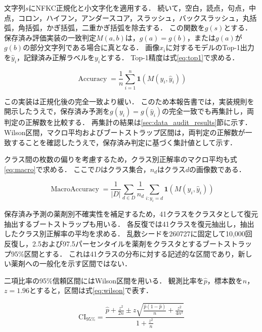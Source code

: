 \documentclass[uplatex,dvipdfmx]{jsarticle}
\begin{document}
文字列$s$にNFKC正規化と小文字化を適用する．
続いて，空白，読点，句点，中点，コロン，ハイフン，アンダースコア，スラッシュ，バックスラッシュ，丸括弧，角括弧，かぎ括弧，二重かぎ括弧を除去する．
この関数を$g(s)$とする．
保存済み評価実装の一致判定$M(a,b)$は，$g(a)=g(b)$，または$g(a)$が$g(b)$の部分文字列である場合に真となる．
画像$x_i$に対するモデルのTop-1出力を$\hat{y}_i$，記録済み正解ラベルを$y_i$とする．
Top-1精度は式\eqref{eq:top1}で求める．

\begin{equation}
  \operatorname{Accuracy}
  =
  \frac{1}{n}
  \sum_{i=1}^{n}
  \mathbf{1}\!\left(M(y_i,\hat{y}_i)\right)
  \label{eq:top1}
\end{equation}

この実装は正規化後の完全一致より緩い．
このため本報告書では，実装規則を開示したうえで，保存済み予測を$g(y_i)=g(\hat{y}_i)$の完全一致でも再集計し，両判定の正解数を比較する．
再集計の結果は\ref{sec:data_audit_results}節に示す．
Wilson区間，マクロ平均およびブートストラップ区間は，両判定の正解数が一致することを確認したうえで，保存済み判定に基づく集計値として示す．

クラス間の枚数の偏りを考慮するため，クラス別正解率のマクロ平均も式\eqref{eq:macro}で求める．
ここで$D$はクラス集合，$n_d$はクラス$d$の画像数である．

\begin{equation}
  \operatorname{MacroAccuracy}
  =
  \frac{1}{|D|}
  \sum_{d \in D}
  \frac{1}{n_d}
  \sum_{i : y_i = d}
  \mathbf{1}\!\left(M(y_i,\hat{y}_i)\right)
  \label{eq:macro}
\end{equation}

保存済み予測の薬剤別不確実性を補足するため，41クラスをクラスタとして復元抽出するブートストラップも用いる．
各反復では41クラスを復元抽出し，抽出したクラス別正解率の平均を求める．
乱数シードを260727に固定して10,000回反復し，2.5および97.5パーセンタイルを薬剤をクラスタとするブートストラップ95\%区間とする．
これは41クラスの分布に対する記述的な区間であり，新しい薬剤への一般化を示す区間ではない．

二項比率の95\%信頼区間にはWilson区間を用いる．
観測比率を$\hat{p}$，標本数を$n$，$z=1.96$とすると，区間は式\eqref{eq:wilson}で表す．

\begin{equation}
  \mathrm{CI}_{95\%}
  =
  \frac{
    \hat{p}+\frac{z^2}{2n}
    \pm
    z\sqrt{\frac{\hat{p}(1-\hat{p})}{n}+\frac{z^2}{4n^2}}
  }{
    1+\frac{z^2}{n}
  }
  \label{eq:wilson}
\end{equation}
\end{document}
